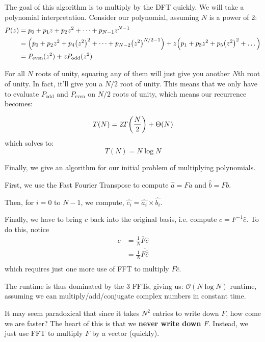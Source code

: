 \begin{algothm} 
    The goal of this algorithm is to multiply by the DFT quickly. We will take a polynomial interpretation.
    Consider our polynomial, assuming $N$ is a power of 2:
    \begin{align*}
        P(z) &= p_0 + p_1z + p_2z^2 + \dots + p_{N - 1}z^{N - 1} \\
        &= \qty(p_0 + p_2z^2 + p_4\qty(z^2)^2 + \dots + p_{N - 2}\qty(z^2)^{N/2 - 1}) + z \qty(p_1 + p_3z^2 + p_5\qty(z^2)^2 + \dots) \\
        &= P_{\text{even}}(z^2) + zP_{\text{odd}}(z^2)
    \end{align*}

    For all $N$ roots of unity, squaring any of them will just give you another $N$th root of unity.
    In fact, it'll give you a $N/2$ root of unity. This means that we only have to evaluate $P_{\text{odd}}$ and
    $P_{\text{even}}$ on $N/2$ roots of unity, which means our recurrence becomes:

    \[ T(N) = 2 T\qty(\frac{N}{2}) + \Theta(N) \]
    which solves to:
    \[ T(N) = N \log N \]
\end{algothm}

Finally, we give an algorithm for our initial problem of multiplying polynomials.
\begin{algothm} 
    First, we use the Fast Fourier Transpose to compute $\hat{a} = Fa$ and $\hat{b} = Fb$.
    
    Then, for $i = 0$ to $N - 1$, we compute,
    $\hat{c_i}  = \hat{a_i} \times \hat{b_i}$.
    
    Finally, we have to bring $c$ back into the original basis, i.e. compute
    $c = F^{-1} \hat{c}$. To do this, notice
    \begin{align*}
        c &= \frac{1}{N} \overline{F} \hat{c} \\
        &= \frac{1}{N} \overline{F \overline{\hat{c}}} \\
    \end{align*}
    which requires just one more use of FFT to multiply $F \overline{\hat{c}}$.

    The runtime is thus dominated by the 3 FFTs, giving us:
    $\mathcal{O}(N \log N)$ runtime, assuming we can multiply/add/conjugate complex numbers
    in constant time.
\end{algothm}

It may seem paradoxical that since it takes $N^2$ entries to write down $F$, how come we are faster?
The heart of this is that we \textbf{never write down $F$}. Instead, we just use FFT to multiply $F$ by a vector (quickly).

